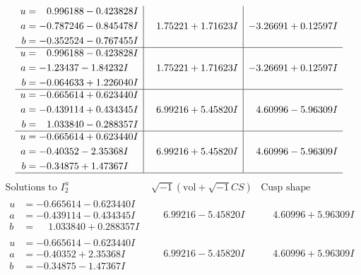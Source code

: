 \documentclass[1p]{elsarticle_modified}
\theoremstyle{definition}
\newcommand{\I}{\sqrt{-1}}
\begin{document}
$$\begin{array}{c|c|c}
\begin{aligned}
u &= \phantom{-}0.996188 - 0.423828 I \\
a &= -0.787246 - 0.845478 I \\
b &= -0.352524 - 0.767455 I\end{aligned}
 & \phantom{-}1.75221 + 1.71623 I & -3.26691 + 0.12597 I \\ \hline\begin{aligned}
u &= \phantom{-}0.996188 - 0.423828 I \\
a &= -1.23437 - 1.84232 I \\
b &= -0.064633 + 1.226040 I\end{aligned}
 & \phantom{-}1.75221 + 1.71623 I & -3.26691 + 0.12597 I \\ \hline\begin{aligned}
u &= -0.665614 + 0.623440 I \\
a &= -0.439114 + 0.434345 I \\
b &= \phantom{-}1.033840 - 0.288357 I\end{aligned}
 & \phantom{-}6.99216 + 5.45820 I & \phantom{-}4.60996 - 5.96309 I \\ \hline\begin{aligned}
u &= -0.665614 + 0.623440 I \\
a &= -0.40352 - 2.35368 I \\
b &= -0.34875 + 1.47367 I\end{aligned}
 & \phantom{-}6.99216 + 5.45820 I & \phantom{-}4.60996 - 5.96309 I\\
 \hline 
 \end{array}$$\newpage$$\begin{array}{c|c|c}  
\text{Solutions to }I^u_{2}& \I (\text{vol} + \sqrt{-1}CS) & \text{Cusp shape}\\
 \hline 
\begin{aligned}
u &= -0.665614 - 0.623440 I \\
a &= -0.439114 - 0.434345 I \\
b &= \phantom{-}1.033840 + 0.288357 I\end{aligned}
 & \phantom{-}6.99216 - 5.45820 I & \phantom{-}4.60996 + 5.96309 I \\ \hline\begin{aligned}
u &= -0.665614 - 0.623440 I \\
a &= -0.40352 + 2.35368 I \\
b &= -0.34875 - 1.47367 I\end{aligned}
 & \phantom{-}6.99216 - 5.45820 I & \phantom{-}4.60996 + 5.96309 I \\ \hline\begin{aligned}

\end{aligned}
\end{array}$$
\end{document}
